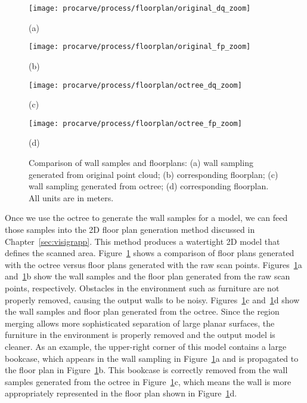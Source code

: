 \documentclass[12pt,onecolumn,oneside]{book}
\begin{document}
\begin{figure}

	\begin{minipage}[t]{0.45\linewidth}
		\centerline{\texttt{[image: procarve/process/floorplan/original\_dq\_zoom]}}
		\centerline{(a)}
	\end{minipage}
	\hfill
	\begin{minipage}[t]{0.45\linewidth}
		\centerline{\texttt{[image: procarve/process/floorplan/original\_fp\_zoom]}}
		\centerline{(b)}
	\end{minipage}
	
	\begin{minipage}[t]{0.45\linewidth}
		\centerline{\texttt{[image: procarve/process/floorplan/octree\_dq\_zoom]}}
		\centerline{(c)}
	\end{minipage}
	\hfill
	\begin{minipage}[t]{0.45\linewidth}
		\centerline{\texttt{[image: procarve/process/floorplan/octree\_fp\_zoom]}}
		\centerline{(d)}
	\end{minipage}

	\caption[Comparison of wall samples and floor plans.]{Comparison of wall samples and floorplans: (a) wall sampling generated from original point cloud; (b) corresponding floorplan; (c) wall sampling generated from octree; (d) corresponding floorplan.  All units are in meters.}
	\label{fig:octree_fp_compare}
\end{figure}

Once we use the octree to generate the wall samples for a model, we can feed those samples into the 2D floor plan generation method discussed in Chapter~\ref{sec:visigrapp}.  This method produces a watertight 2D model that defines the scanned area.  Figure~\ref{fig:octree_fp_compare} shows a comparison of floor plans generated with the octree versus floor plans generated with the raw scan points.  Figures~\ref{fig:octree_fp_compare}a and~\ref{fig:octree_fp_compare}b show the wall samples and the floor plan generated from the raw scan points, respectively.  Obstacles in the environment such as furniture are not properly removed, causing the output walls to be noisy.  Figures~\ref{fig:octree_fp_compare}c and~\ref{fig:octree_fp_compare}d show the wall samples and floor plan generated from the octree.  Since the region merging allows more sophisticated separation of large planar surfaces, the furniture in the environment is properly removed and the output model is cleaner.  As an example, the upper-right corner of this model contains a large bookcase, which appears in the wall sampling in Figure~\ref{fig:octree_fp_compare}a and is propagated to the floor plan in Figure~\ref{fig:octree_fp_compare}b.  This bookcase is correctly removed from the wall samples generated from the octree in Figure~\ref{fig:octree_fp_compare}c, which means the wall is more appropriately represented in the floor plan shown in Figure~\ref{fig:octree_fp_compare}d.
\end{document}

